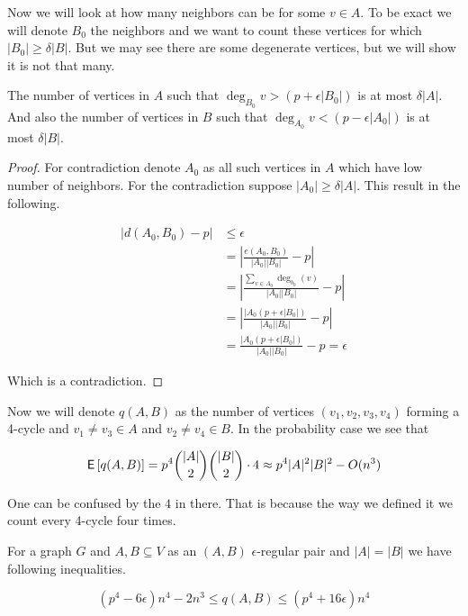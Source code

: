 Now we will look at how many neighbors can be for some $v \in A$. To be exact we will denote $B_{0}$ the neighbors and we want to count these vertices for which $|B_{0}| \geq \delta |B|$. But we may see there are some degenerate vertices, but we will show it is not that many.

\begin{lemma}
	The number of vertices in $A$ such that $\deg_{B_{0}}v > (p + \epsilon |B_{0}|)$ is at most $\delta |A|$. And also the number of vertices in $B$ such that $\deg_{A_{0}}v < (p - \epsilon |A_{0}|)$ is at most $\delta |B|$.
\end{lemma}

\begin{proof}
	For contradiction denote $A_{0}$ as all such vertices in $A$ which have low number of neighbors. For the contradiction suppose $|A_{0}| \geq \delta |A|$. This result in the following.
	
	$$
	\begin{aligned}
		|d(A_{0}, B_{0}) - p| &\leq \epsilon \\
		 &= \left| \frac{e(A_{0},B_{0})}{|A_{0}| |B_{0}|} - p \right| \\
		 &= \left| \frac{\sum_{v \in A_{0}} \deg_{b_{0}}(v)}{|A_{0}| |B_{0}|} - p \right| \\
		 &= \left| \frac{|A_{0} (p+ \epsilon |B_{0}|)}{|A_{0}| |B_{0}|} - p \right| \\
		 &= \frac{|A_{0} (p+ \epsilon |B_{0}|)}{|A_{0}| |B_{0}|} - p = \epsilon
	\end{aligned}
	$$
	
	Which is a contradiction.
\end{proof}

Now we will denote $q(A,B)$ as the number of vertices $(v_1, v_2, v_3, v_4)$ forming a 4-cycle and $v_1 \neq v_3 \in A$ and $v_2 \neq v_4 \in B$. In the probability case we see that 

$$
\operatorname{\textsf{E}\,} [q(A,B)] = p^4 \binom{|A|}{2} \binom{|B|}{2} \cdot 4 \approx p^4 |A|^2 |B|^2 - O(n^3)
$$

One can be confused by the $4$ in there. That is because the way we defined it we count every 4-cycle four times.

\begin{lemma}
	For a graph $G$ and $A, B \subseteq V$ as an $(A, B)$ $\epsilon$-regular pair and $|A| = |B|$ we have following inequalities.
	
	$$
	(p^4 - 6 \epsilon)n^4 - 2n^3 \leq q(A,B) \leq (p^4 + 16 \epsilon) n^4
	$$
\end{lemma}

